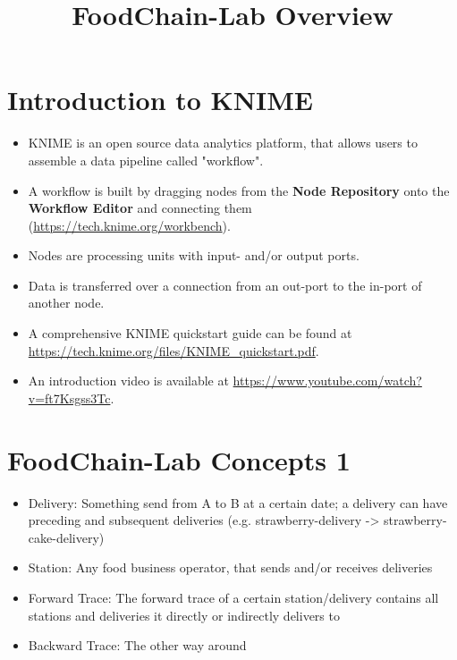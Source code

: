 \documentclass{beamer}
\title{FoodChain-Lab Overview}
\date{}
\begin{document}
\maketitle

\section{Introduction to KNIME}

\begin{frame}
	\begin{itemize}
		\item KNIME is an open source data analytics platform, that allows users to assemble a data pipeline called "workflow".
		\item A workflow is built by dragging nodes from the \textbf{Node Repository} onto the \textbf{Workflow Editor} and connecting them (\url{https://tech.knime.org/workbench}).
		\item Nodes are processing units with input- and/or output ports.
		\item Data is transferred over a connection from an out-port to the in-port of another node.
		\item A comprehensive KNIME quickstart guide can be found at \url{https://tech.knime.org/files/KNIME_quickstart.pdf}.
		\item An introduction video is available at \url{https://www.youtube.com/watch?v=ft7Ksgss3Tc}.
	\end{itemize}
\end{frame}

\section{FoodChain-Lab Concepts 1}

\begin{frame}
	\begin{itemize}
		\item Delivery: Something send from A to B at a certain date; a delivery can have preceding and subsequent deliveries (e.g. strawberry-delivery -> strawberry-cake-delivery)
		\item Station: Any food business operator, that sends and/or receives deliveries
		\item Forward Trace: The forward trace of a certain station/delivery contains all stations and deliveries it directly or indirectly delivers to
		\item Backward Trace: The other way around
	\end{itemize}
\end{frame}
\end{document}
